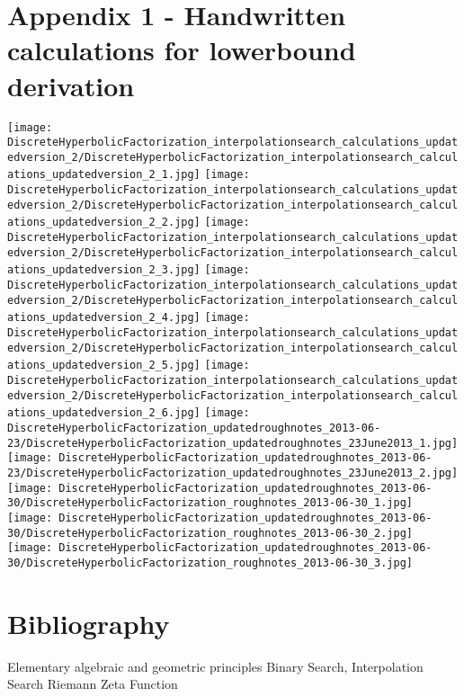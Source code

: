 \documentclass[11pt,onecolumn]{article}
\begin{document}
\section{Appendix 1 - Handwritten calculations for lowerbound derivation}
\texttt{[image: DiscreteHyperbolicFactorization\_interpolationsearch\_calculations\_updatedversion\_2/DiscreteHyperbolicFactorization\_interpolationsearch\_calculations\_updatedversion\_2\_1.jpg]} 
\texttt{[image: DiscreteHyperbolicFactorization\_interpolationsearch\_calculations\_updatedversion\_2/DiscreteHyperbolicFactorization\_interpolationsearch\_calculations\_updatedversion\_2\_2.jpg]} 
\texttt{[image: DiscreteHyperbolicFactorization\_interpolationsearch\_calculations\_updatedversion\_2/DiscreteHyperbolicFactorization\_interpolationsearch\_calculations\_updatedversion\_2\_3.jpg]} 
\texttt{[image: DiscreteHyperbolicFactorization\_interpolationsearch\_calculations\_updatedversion\_2/DiscreteHyperbolicFactorization\_interpolationsearch\_calculations\_updatedversion\_2\_4.jpg]} 
\texttt{[image: DiscreteHyperbolicFactorization\_interpolationsearch\_calculations\_updatedversion\_2/DiscreteHyperbolicFactorization\_interpolationsearch\_calculations\_updatedversion\_2\_5.jpg]} 
\texttt{[image: DiscreteHyperbolicFactorization\_interpolationsearch\_calculations\_updatedversion\_2/DiscreteHyperbolicFactorization\_interpolationsearch\_calculations\_updatedversion\_2\_6.jpg]} 
\texttt{[image: DiscreteHyperbolicFactorization\_updatedroughnotes\_2013-06-23/DiscreteHyperbolicFactorization\_updatedroughnotes\_23June2013\_1.jpg]} 
\texttt{[image: DiscreteHyperbolicFactorization\_updatedroughnotes\_2013-06-23/DiscreteHyperbolicFactorization\_updatedroughnotes\_23June2013\_2.jpg]} 
\texttt{[image: DiscreteHyperbolicFactorization\_updatedroughnotes\_2013-06-30/DiscreteHyperbolicFactorization\_roughnotes\_2013-06-30\_1.jpg]} 
\texttt{[image: DiscreteHyperbolicFactorization\_updatedroughnotes\_2013-06-30/DiscreteHyperbolicFactorization\_roughnotes\_2013-06-30\_2.jpg]} 
\texttt{[image: DiscreteHyperbolicFactorization\_updatedroughnotes\_2013-06-30/DiscreteHyperbolicFactorization\_roughnotes\_2013-06-30\_3.jpg]} 
\section{Bibliography}
\begin{thebibliography}{99}
 Elementary algebraic and geometric principles
 Binary Search, Interpolation Search
 Riemann Zeta Function 
\end{thebibliography}
\end{document}
